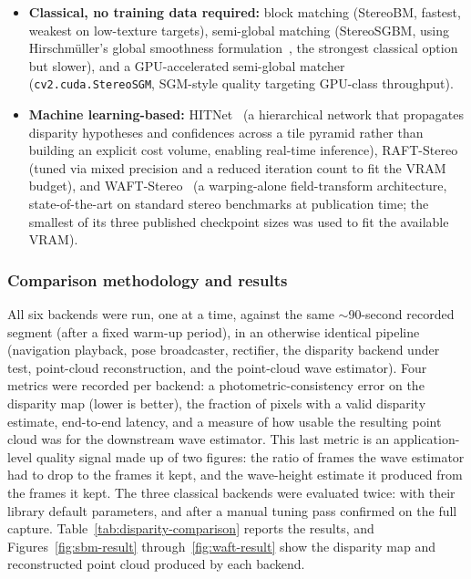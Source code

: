 \begin{itemize}
	\item \textbf{Classical, no training data required:} block matching (StereoBM, fastest, weakest on low-texture targets), semi-global matching (StereoSGBM, using Hirschmüller's global smoothness formulation~\cite{hirschmuller2008stereo}, the strongest classical option but slower), and a GPU-accelerated semi-global matcher (\texttt{cv2.\allowbreak{}cuda.\allowbreak{}StereoSGM}, SGM-style quality targeting GPU-class throughput).
	\item \textbf{Machine learning-based:} HITNet~\cite{DBLP:journals/corr/abs-2007-12140} (a hierarchical network that propagates disparity hypotheses and confidences across a tile pyramid rather than building an explicit cost volume, enabling real-time inference), RAFT-Stereo~\cite{DBLP:journals/corr/abs-2109-07547} (tuned via mixed precision and a reduced iteration count to fit the VRAM budget), and WAFT-Stereo~\cite{wang2026waftstereowarpingalonefieldtransforms} (a warping-alone field-transform architecture, state-of-the-art on standard stereo benchmarks at publication time; the smallest of its three published checkpoint sizes was used to fit the available VRAM).
\end{itemize}

\subsubsection*{Comparison methodology and results}

All six backends were run, one at a time, against the same $\sim$90-second recorded segment (after a fixed warm-up period), in an otherwise identical pipeline (navigation playback, pose broadcaster, rectifier, the disparity backend under test, point-cloud reconstruction, and the point-cloud wave estimator). Four metrics were recorded per backend: a photometric-consistency error on the disparity map (lower is better), the fraction of pixels with a valid disparity estimate, end-to-end latency, and a measure of how usable the resulting point cloud was for the downstream wave estimator. This last metric is an application-level quality signal made up of two figures: the ratio of frames the wave estimator had to drop to the frames it kept, and the wave-height estimate it produced from the frames it kept. The three classical backends were evaluated twice: with their library default parameters, and after a manual tuning pass confirmed on the full capture. Table~\ref{tab:disparity-comparison} reports the results, and Figures~\ref{fig:sbm-result} through~\ref{fig:waft-result} show the disparity map and reconstructed point cloud produced by each backend.

